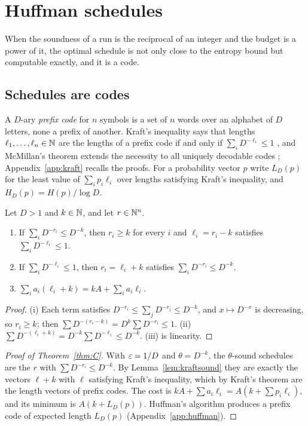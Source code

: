 \section{Huffman schedules}\label{sec:huffman}

When the soundness of a run is the reciprocal of an integer and the budget is a power of it, the optimal schedule is not only close to the entropy bound but computable exactly, and it is a code.

\subsection{Schedules are codes}

A $D$-ary \emph{prefix code} for $n$ symbols is a set of $n$ words over an alphabet of $D$ letters, none a prefix of another. Kraft's inequality says that lengths $\ell_{1},\dots,\ell_{n}\in\mathbb{N}$ are the lengths of a prefix code if and only if $\sum_{i}D^{-\ell_{i}}\le1$ \cite{Kra49}, and McMillan's theorem extends the necessity to all uniquely decodable codes \cite{McM56}; Appendix~\ref{app:kraft} recalls the proofs. For a probability vector $p$ write $L_{D}(p)$ for the least value of $\sum_{i}p_{i}\ell_{i}$ over lengths satisfying Kraft's inequality, and $H_{D}(p)=H(p)/\log D$.

\begin{lemma}\label{lem:kraftsound}
Let $D>1$ and $k\in\mathbb{N}$, and let $r\in\mathbb{N}^{n}$.
\begin{enumerate}[label=\textup{(\roman*)},leftmargin=2.2em,itemsep=1pt]
\item If $\sum_{i}D^{-r_{i}}\le D^{-k}$, then $r_{i}\ge k$ for every $i$ and $\ell_{i}=r_{i}-k$ satisfies $\sum_{i}D^{-\ell_{i}}\le1$.
\item If $\sum_{i}D^{-\ell_{i}}\le1$, then $r_{i}=\ell_{i}+k$ satisfies $\sum_{i}D^{-r_{i}}\le D^{-k}$.
\item $\sum_{i}a_{i}(\ell_{i}+k)=kA+\sum_{i}a_{i}\ell_{i}$.
\end{enumerate}
\end{lemma}

\begin{proof}
(i) Each term satisfies $D^{-r_{i}}\le\sum_{j}D^{-r_{j}}\le D^{-k}$, and $x\mapsto D^{-x}$ is decreasing, so $r_{i}\ge k$; then $\sum D^{-(r_{i}-k)}=D^{k}\sum D^{-r_{i}}\le1$. (ii) $\sum D^{-(\ell_{i}+k)}=D^{-k}\sum D^{-\ell_{i}}\le D^{-k}$. (iii) is linearity.
\end{proof}

\begin{proof}[Proof of Theorem~\ref{thm:C}]
With $\varepsilon=1/D$ and $\theta=D^{-k}$, the $\theta$-sound schedules are the $r$ with $\sum D^{-r_{i}}\le D^{-k}$. By Lemma~\ref{lem:kraftsound} they are exactly the vectors $\ell+k$ with $\ell$ satisfying Kraft's inequality, which by Kraft's theorem are the length vectors of prefix codes. The cost is $kA+\sum a_{i}\ell_{i}=A(k+\sum p_{i}\ell_{i})$, and its minimum is $A(k+L_{D}(p))$. Huffman's algorithm produces a prefix code of expected length $L_{D}(p)$ (Appendix~\ref{app:huffman}).
\end{proof}

